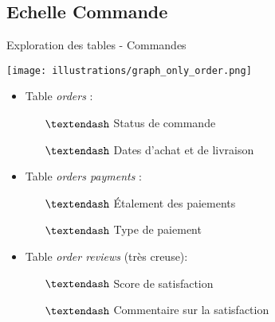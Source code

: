 \documentclass[10pt]{beamer}
\begin{document}
\subsection{Echelle Commande}
\begin{frame}{Exploration des tables - Commandes }
\begin{minipage}{0.4\linewidth}
        \begin{center}
           \texttt{[image: illustrations/graph\_only\_order.png]}
        \end{center}
\end{minipage}
\begin{minipage}{0.58\linewidth}
\begin{itemize}
    \item Table \textit{orders} :
    \begin{itemize}
        \item[$\textendash$] Status de commande
        \item[$\textendash$] Dates d'achat et de livraison\\
    \end{itemize}
    \vspace{0.5cm}

    \item Table \textit{orders payments} : 
    \begin{itemize}
        \item[$\textendash$] Étalement des paiements
        \item[$\textendash$] Type de paiement
    \end{itemize}
\end{itemize}
\end{minipage}

\vspace{0.5cm}
\begin{minipage}{0.05\linewidth}
\hfill
\end{minipage}
\begin{minipage}{0.90\linewidth}
    \begin{itemize}
        \item Table \textit{order reviews}  (très creuse):
        \begin{itemize}
            \item[$\textendash$] Score de satisfaction
            \item[$\textendash$] Commentaire sur la satisfaction
        \end{itemize}
    \end{itemize}
\end{minipage}
\end{frame}
\end{document}
